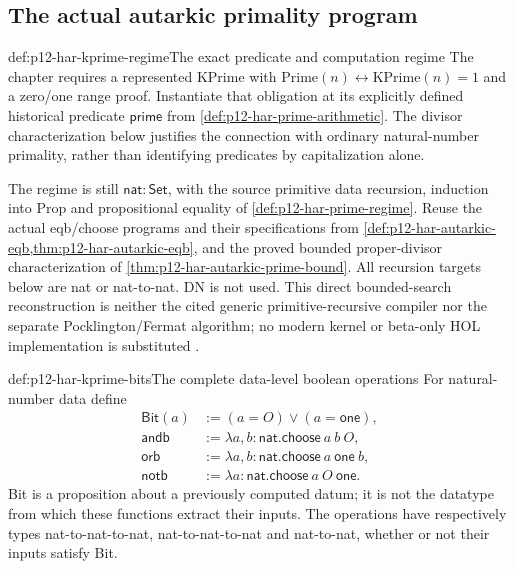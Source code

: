 \subsection{The actual autarkic primality program}

\begin{hbdefinition}{def:p12-har-kprime-regime}{The exact predicate and computation regime}
The chapter requires a represented KPrime with
\(\mathrm{Prime}(n)\leftrightarrow\mathrm{KPrime}(n)=1\) and a
zero/one range proof. Instantiate that obligation at its explicitly
defined historical predicate \(\mathsf{prime}\) from
\cref{def:p12-har-prime-arithmetic}. The divisor characterization below
justifies the connection with ordinary natural-number primality, rather
than identifying predicates by capitalization alone.

The regime is still \(\mathsf{nat}:\mathsf{Set}\), with the source
primitive data recursion, induction into Prop and propositional equality
of \cref{def:p12-har-prime-regime}. Reuse the actual eqb/choose programs
and their specifications from \cref{def:p12-har-autarkic-eqb,thm:p12-har-autarkic-eqb},
and the proved bounded proper-divisor characterization of
\cref{thm:p12-har-autarkic-prime-bound}. All recursion targets below
are nat or nat-to-nat. DN is not used. This direct bounded-search
reconstruction is neither the cited generic primitive-recursive compiler
nor the separate Pocklington/Fermat algorithm; no modern kernel or
beta-only HOL implementation is substituted
\cite[pp.~1221--1223]{BarendregtGeuvers2001}.
\end{hbdefinition}

\begin{hbdefinition}{def:p12-har-kprime-bits}{The complete data-level boolean operations}
For natural-number data define
\[
\begin{aligned}
 \mathsf{Bit}(a)&:=(a=O)\vee(a=\mathsf{one}),\\
 \mathsf{andb}&:=\lambda a,b:\mathsf{nat}.
                      \mathsf{choose}\ a\ b\ O,\\
 \mathsf{orb}&:=\lambda a,b:\mathsf{nat}.
                      \mathsf{choose}\ a\ \mathsf{one}\ b,\\
 \mathsf{notb}&:=\lambda a:\mathsf{nat}.
                      \mathsf{choose}\ a\ O\ \mathsf{one}.
\end{aligned}
\]
Bit is a proposition about a previously computed datum; it is not the
datatype from which these functions extract their inputs. The operations
have respectively types nat-to-nat-to-nat, nat-to-nat-to-nat and
nat-to-nat, whether or not their inputs satisfy Bit.
\end{hbdefinition}

